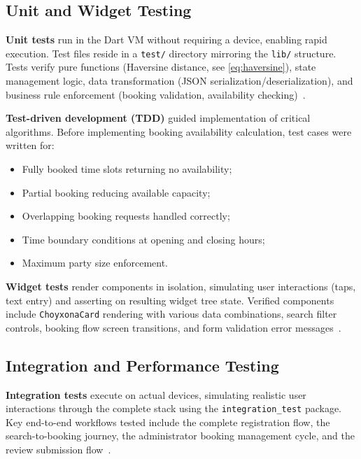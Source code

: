 \subsection{Unit and Widget Testing}
\label{subsec:unit-widget}

\textbf{Unit tests} run in the Dart VM without requiring a device, enabling rapid execution.
Test files reside in a \texttt{test/} directory mirroring the \texttt{lib/} structure.
Tests verify pure functions (Haversine distance, see \cref{eq:haversine}), state management logic, data transformation (JSON serialization/deserialization), and business rule enforcement (booking validation, availability checking)~\cite{napoli2021}.

\textbf{Test-driven development (TDD)} guided implementation of critical algorithms.
Before implementing booking availability calculation, test cases were written for:
\begin{itemize}
  \item Fully booked time slots returning no availability;
  \item Partial booking reducing available capacity;
  \item Overlapping booking requests handled correctly;
  \item Time boundary conditions at opening and closing hours;
  \item Maximum party size enforcement.
\end{itemize}

\textbf{Widget tests} render components in isolation, simulating user interactions (taps, text entry) and asserting on resulting widget tree state.
Verified components include \texttt{ChoyxonaCard} rendering with various data combinations, search filter controls, booking flow screen transitions, and form validation error messages~\cite{windmill2020}.

\subsection{Integration and Performance Testing}
\label{subsec:integration-perf}

\textbf{Integration tests} execute on actual devices, simulating realistic user interactions through the complete stack using the \texttt{integration\_test} package.
Key end-to-end workflows tested include the complete registration flow, the search-to-booking journey, the administrator booking management cycle, and the review submission flow~\cite{payne2019}.


